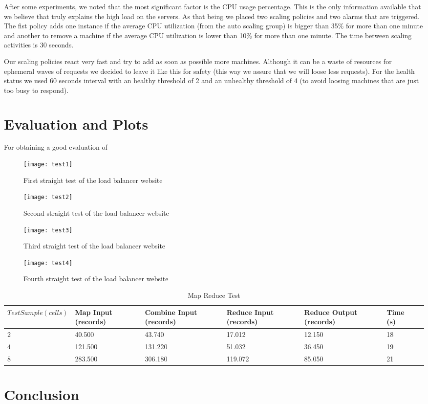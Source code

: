 \documentclass{article}
\begin{document}
After some experiments, we noted that the most significant factor is the CPU usage percentage. This is the only information available that we believe that truly explains the high load on the servers. As that being we placed two scaling policies and two alarms that are triggered. The fist policy adds one instance if the average CPU utilization (from the auto scaling group) is bigger than 35\% for more than one minute and another to remove a machine if the average CPU utilization is lower than 10\% for more than one minute. The time between scaling activities is 30 seconds.

Our scaling policies react very fast and try to add as soon as possible more machines. Although it can be a waste of resources for ephemeral waves of requests we decided to leave it like this for safety (this way we assure that we will loose less requests). For the health status we used 60 seconds interval with an healthy threshold of 2 and an unhealthy threshold of 4 (to avoid loosing machines that are just too busy to respond). 

\section{Evaluation and Plots}
For obtaining a good evaluation of 


\begin{figure}[H]
      \centering
      \texttt{[image: test1]}
      \caption{First straight test of the load balancer website}
      \label{load_balancer_test1}
\end{figure}
\begin{figure}[H]
      \centering
      \texttt{[image: test2]}
      \caption{Second straight test of the load balancer website}
      \label{load_balancer_test2}
\end{figure}
\begin{figure}[H]
      \centering
      \texttt{[image: test3]}
      \caption{Third straight test of the load balancer website}
      \label{load_balancer_test3}
\end{figure}
\begin{figure}[H]
      \centering
      \texttt{[image: test4]}
      \caption{Fourth straight test of the load balancer website}
      \label{load_balancer_test4}
\end{figure}
\begin{table}[htbp!]
\begin{center}
\caption{Map Reduce Test}
\begin{tabular}{*{7}{|l}|}
\hline
 $Test Sample (cells)$ & Map Input (records) & Combine Input (records) & Reduce Input (records) & Reduce Output (records) & Time (s) \\ \hline
$2$ & 40.500 & 43.740 & 17.012 & 12.150 & 18 \\ \hline
$4$ & 121.500 & 131.220 & 51.032 & 36.450 & 19 \\ \hline
$8$ & 283.500 & 306.180 & 119.072 & 85.050 & 21 \\ \hline
\end{tabular}
\end{center}
\label{map_reduce_test}
\end{table}
\section{Conclusion}
\end{document}
